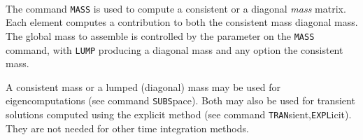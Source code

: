  \\{\smallskip}
\headb

The command {\tt MASS} is used to compute a consistent
or a diagonal {\it mass} matrix.  Each element
computes a contribution to both the consistent mass
diagonal mass.
The global mass to assemble is controlled by the parameter on the {\tt MASS}
command, with {\tt LUMP} producing a diagonal mass and any option the
consistent mass.

A consistent mass or a lumped (diagonal) mass 
may be used for eigencomputations (see command
{\tt SUBS}pace).  Both may also be used for transient solutions computed
using the explicit method (see command
{\tt TRAN}sient,{\tt EXPL}icit). They are not needed for other time integration
methods.
\vfill\eject
